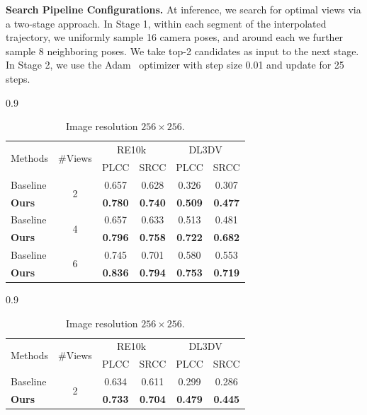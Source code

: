\noindent\textbf{Search Pipeline Configurations.} At inference, we search for optimal views via a two-stage approach. In Stage 1, within each segment of the interpolated trajectory, we uniformly sample 16 camera poses, and around each we further sample 8 neighboring poses. We take top-2 candidates as input to the next stage. In Stage 2, we use the Adam~\cite{kingma2014adam} optimizer with step size 0.01 and update for 25 steps.
\begin{table}[t]
\small
  \centering
  \begin{subtable}[t]{0.9\linewidth}
  \begin{tabular}{l| c | c c c c}
    \toprule
    \multirow{2}{*}{Methods} & \multirow{2}{*}{\#Views} & \multicolumn{2}{c}{RE10k~\cite{re10k}} & \multicolumn{2}{c}{DL3DV~\cite{dl3dv}} \\
     & & PLCC & SRCC & PLCC & SRCC \\
    \midrule
    Baseline & \multirow{2}{*}{2} & 0.657 & 0.628 & 0.326 & 0.307 \\
    \textbf{Ours} & & \textbf{0.780} & \textbf{0.740} &  \textbf{0.509} & \textbf{0.477} \\
    \midrule
    Baseline & \multirow{2}{*}{4} & 0.657 & 0.633 & 0.513 & 0.481\\
    \textbf{Ours} & & \textbf{0.796} & \textbf{0.758} &  \textbf{0.722} & \textbf{0.682} \\
    \midrule
    Baseline & \multirow{2}{*}{6} & 0.745 & 0.701 & 0.580 & 0.553\\
    \textbf{Ours} & & \textbf{0.836} & \textbf{0.794} &  \textbf{0.753} & \textbf{0.719}\\
    \bottomrule
  \end{tabular}
  \caption{Image resolution $256\times 256$.}
  \label{tab:correlation256}
  \end{subtable}
  \vfill
  \begin{subtable}[t]{0.9\linewidth}
  \begin{tabular}{l| c | c c c c}
    \toprule
    \multirow{2}{*}{Methods} & \multirow{2}{*}{\#Views} & \multicolumn{2}{c}{RE10k~\cite{re10k}} & \multicolumn{2}{c}{DL3DV~\cite{dl3dv}} \\
     & & PLCC & SRCC & PLCC & SRCC \\
    \midrule
    Baseline & \multirow{2}{*}{2} & 0.634 & 0.611 & 0.299 & 0.286 \\
    \textbf{Ours} & & \textbf{0.733} & \textbf{0.704} & \textbf{0.479} & \textbf{0.445} \\
    \midrule

\end{tabular}
\end{subtable}
\end{table}
